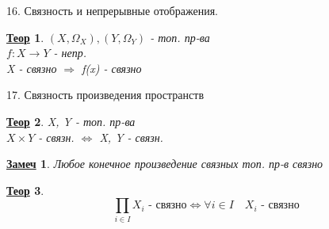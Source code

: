 \documentclass[12pt, fleqn]{article}
\newenvironment{question}[1]{\hspace*{-4em} #1}{\newpage}
\newcommand{\ra}{\Rightarrow}
\newcommand{\rla}{\Leftrightarrow}
\newcommand{\q}{\quad}
\theoremstyle{nonumbermarginbreak}
\newtheorem{theorem}{\hspace*{-2em}\underline{\bfseries Теор}}[section]
\newtheorem{remark}{\hspace*{-2em}\underline{\bfseries Замеч}}[section]
\begin{document}
    \begin{question}{16. Связность и непрерывные отображения.}
        \begin{theorem} 
            $(X, \Omega_X), (Y, \Omega_Y)$ - топ. пр-ва\\
            $f: X \rightarrow Y$ - непр.\\
            X - связно $\ra$ f(x) - связно
        \end{theorem}
    \end{question}

    \begin{question}{17. Связность произведения пространств}
        \begin{theorem} 
            X, Y - топ. пр-ва\\
            $X \times Y$ - связн. $\rla$ X, Y - связн.
        \end{theorem}

        \begin{remark} 
            Любое конечное произведение связных топ. пр-в связно
        \end{remark}

        \begin{theorem} 
            \[\prod_{i \in I} X_i \text{ - связно} \rla \forall i \in I \q X_i \text{ - связно}\] 
        \end{theorem}
    \end{question}
\end{document}
